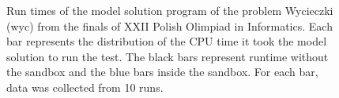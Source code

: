 \documentclass[en]{pracamgr}
\begin{document}
\begin{appendices}
\begin{figure}[H]
\caption{Run times of the model solution program of the problem Wycieczki (wyc) from the finals of XXII Polish Olimpiad in Informatics. Each bar represents the distribution of the CPU time it took the model solution to run the test. The black bars represent runtime without the sandbox and the blue bars inside the sandbox. For each bar, data was collected from 10 runs.}
\label{figure:wyc_model_solution_cpu_time}
\end{figure}

\end{appendices}
\end{document}
